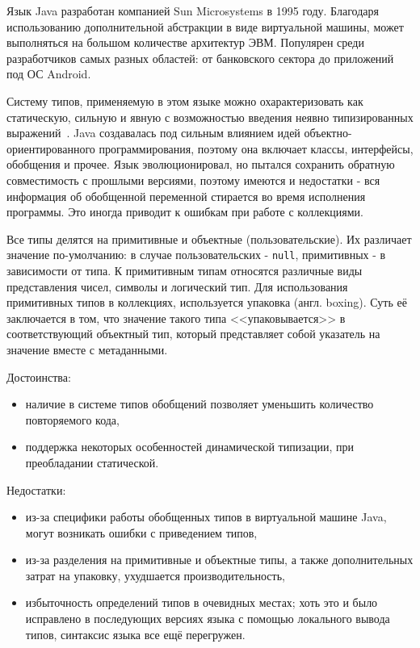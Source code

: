 Язык Java разработан компанией Sun Microsystems в 1995 году.
Благодаря использованию дополнительной абстракции в виде виртуальной машины, может выполняться на большом количестве архитектур ЭВМ.
Популярен среди разработчиков самых разных областей: от банковского сектора до приложений под ОС Android.

Систему типов, применяемую в этом языке можно охарактеризовать как статическую, сильную и явную с возможностью введения неявно типизированных выражений~\cite{JavaTypeSystem}.
Java создавалась под сильным влиянием идей объектно-ориентированного программирования, поэтому она включает классы, интерфейсы, обобщения и прочее.
Язык эволюционировал, но пытался сохранить обратную совместимость с прошлыми версиями, поэтому имеются и недостатки - вся информация об обобщенной переменной стирается во время исполнения программы.
Это иногда приводит к ошибкам при работе с коллекциями.

Все типы делятся на примитивные и объектные (пользовательские).
Их различает значение по-умолчанию: в случае пользовательских - \lstinline{null}, примитивных - в зависимости от типа.
К примитивным типам относятся различные виды представления чисел, символы и логический тип.
Для использования примитивных типов в коллекциях, используется упаковка (англ. boxing).
Суть её заключается в том, что значение такого типа <<упаковывается>> в соответствующий объектный тип, который представляет собой указатель на значение вместе с метаданными.

Достоинства:
\begin{itemize}
    \item наличие в системе типов обобщений позволяет уменьшить количество повторяемого кода,
    \item поддержка некоторых особенностей динамической типизации, при преобладании статической.
\end{itemize}

Недостатки:
\begin{itemize}
    \item из-за специфики работы обобщенных типов в виртуальной машине Java, могут возникать ошибки с приведением типов,
    \item из-за разделения на примитивные и объектные типы, а также дополнительных затрат на упаковку, ухудшается производительность,
    \item избыточность определений типов в очевидных местах; хоть это и было исправлено в последующих версиях языка с помощью локального вывода типов, синтаксис языка все ещё перегружен.
\end{itemize}

